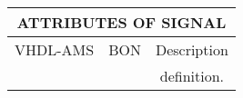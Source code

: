 \begin{center}
\begin{tabular}{ c  c  c }
\multicolumn{3}{c}{\textbf{ATTRIBUTES OF SIGNAL}}\\ 
\hline \hline
VHDL-AMS & BON & Description \\ 
\hline \hline

\begin{minipage}[c]{2.4cm} 
\centering
\smallskip \smallskip 

\smallskip \smallskip
\end{minipage}  
&
\begin{minipage}[c]{4.6cm}
\centering 
\smallskip \smallskip

\smallskip \smallskip
\end{minipage}  
& 
\begin{minipage}[c]{6cm}  
\smallskip \smallskip
definition.
\smallskip \smallskip
\end{minipage}\\ 
\end{tabular}
\end{center}
